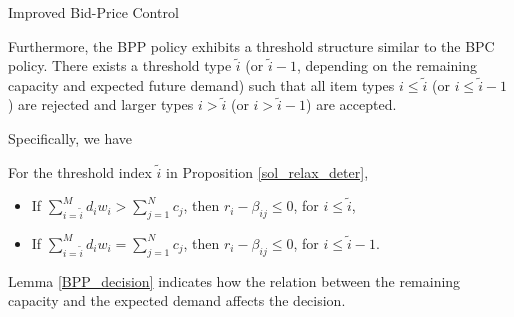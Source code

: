 \begin{algorithm}[H]
    \caption{Improved Bid-Price Control}\label{algo_improve_bid}
\end{algorithm}

Furthermore, the BPP policy exhibits a threshold structure similar to the BPC policy. There exists a threshold type $\tilde{i}$ (or $\tilde{i}-1$, depending on the remaining capacity and expected future demand) such that all item types $i \leq \tilde{i}$ (or $i \leq \tilde{i}-1$) are rejected and larger types $i > \tilde{i}$ (or $i > \tilde{i}-1$) are accepted.


Specifically, we have 
\begin{lem}\label{BPP_decision}    
    For the threshold index $\tilde{i}$ in Proposition \ref{sol_relax_deter},
    \begin{itemize}
        \item If $\sum_{i=\tilde{i}}^{M} d_{i} w_{i} > \sum_{j=1}^{N} c_{j}$, then $r_i - \beta_{ij} \leq 0$, for $i \leq \tilde{i}$,
        \item If $\sum_{i=\tilde{i}}^{M} d_{i} w_{i} = \sum_{j=1}^{N} c_{j}$, then $r_i - \beta_{ij} \leq 0$, for $i \leq \tilde{i}-1$.
    \end{itemize}
\end{lem}

Lemma \ref{BPP_decision} indicates how the relation between the remaining capacity and the expected demand affects the decision.




